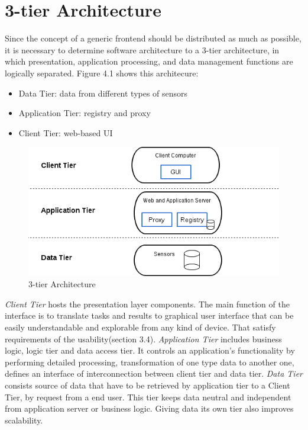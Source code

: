 \section{3-tier Architecture}
Since the concept of a generic frontend should be distributed as much as possible, it is necessary to determine software architecture 
to a 3-tier architecture, in which presentation, application processing, and data management functions are logically separated.
Figure 4.1 shows this architecure:
\begin{itemize}
\item Data Tier: data from different types of sensors
\item Application Tier: registry and proxy
\item Client Tier: web-based UI
\end{itemize} 
\begin{figure}[!ht]
\centering
\includegraphics[scale=0.7]{images/3tier.png}   
\caption[3-tier Architecture]{3-tier Architecture}
\label{img:3-tier Architecture}                           
\end{figure}
\emph{Client Tier} hosts the presentation layer components. The main function of the interface is to translate tasks and results to graphical user interface that can be easily understandable and explorable from any kind of device. That satisfy requirements of the usability(section 3.4).
\newline
\emph{Application Tier} includes business logic, logic tier and data access tier. It controls an application's functionality by performing detailed processing, transformation of one type data to another one, defines an interface of interconnection between client tier and data tier.
\newline
\emph{Data Tier} consists source of data that have to be retrieved by application tier to a Client Tier, by request from a end user. This tier keeps data neutral and independent from application server or business logic. Giving data its own tier also improves scalability. 
